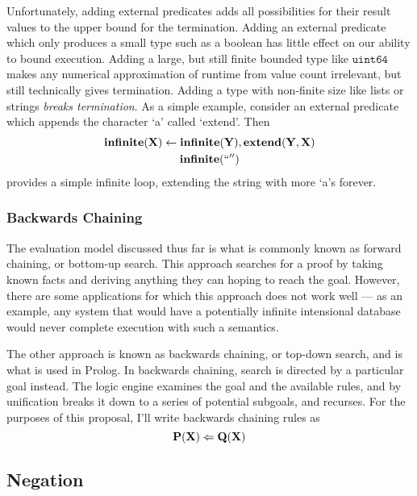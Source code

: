 Unfortunately, adding external predicates adds all possibilities for their result values to the upper bound for the termination.
Adding an external predicate which only produces a small type such as a boolean has little effect on our ability to bound execution.
Adding a large, but still finite bounded type like $\texttt{uint64}$ makes any numerical approximation of runtime from value count irrelevant, but still technically gives termination.
Adding a type with non-finite size like lists or strings \emph{breaks termination}.
As a simple example, consider an external predicate which appends the character `a' called `extend'. Then
\begin{gather*}
  {\bf infinite}({\bf X}) \leftarrow {\bf infinite}({\bf Y}), {\bf extend}({\bf Y}, {\bf X})\\
  {\bf infinite}(``'')
\end{gather*}
provides a simple infinite loop, extending the string with more `a's forever.

\subsubsection{Backwards Chaining}
\label{sec:bchain}
The evaluation model discussed thus far is what is commonly known as forward chaining, or bottom-up search.
This approach searches for a proof by taking known facts and deriving anything they can hoping to reach the goal.
However, there are some applications for which this approach does not work well --- as an example, any system that would have a potentially infinite intensional database would never complete execution with such a semantics.

The other approach is known as backwards chaining, or top-down search, and is what is used in Prolog.
In backwards chaining, search is directed by a particular goal instead.
The logic engine examines the goal and the available rules, and by unification breaks it down to a series of potential subgoals, and recurses.
For the purposes of this proposal, I'll write backwards chaining rules as
\[
  {\bf P}({\bf X}) \Leftarrow {\bf Q}({\bf X})
\]

\subsection{Negation}
